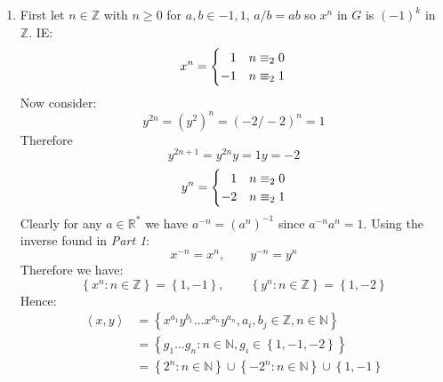 \documentclass[a4paper, 11pt]{article}
\newcommand{\NN}{\mathbb{N}}
\newcommand{\ZZ}{\mathbb{Z}}
\newcommand{\RR}{\mathbb{R}}
\def\set#1{\left\{ #1 \right\}}
\def\gen#1{\left\langle#1 \right\rangle}
\begin{document}
\begin{enumerate}[label=(\alph*)]
	\item 
	First let $n\in\ZZ$ with $n\geq 0$ for $a,b\in{-1,1}$, $a/b=ab$ so $x^n$ in $G$ is $(-1)^k$ in $\ZZ$. IE: 
	\[
		x^n = \begin{cases}
			\hphantom{-}
			 1 & n \equiv_2 0  \\
			-1 & n \equiv_2 1 
		\end{cases}	
	\]
	Now consider:
	\[
		y^{2n} = (y^2)^n = (-2/-2)^n = 1	
	\]  
	Therefore 
	\[
		y^{2n+1}=y^{2n}y = 1y = -2
	\]
	\[
		y^n = \begin{cases}
			\hphantom{-}
			 1 & n \equiv_2 0  \\
			-2 & n \equiv_2 1 
		\end{cases}	
	\]
	Clearly for any $a\in\RR^*$ we have $a^{-n}=(a^n)^{-1}$ since $a^{-n}a^{n}=1$. Using the inverse found in \textit{Part 1}: 
	\[
		x^{-n}=x^n	
		,\qquad
		y^{-n}=y^n 	
	\]
	Therefore we have:
	\[
		\set{x^n: n\in\ZZ}=\set{1,-1},\qquad
		\set{y^n: n\in\ZZ}=\set{1,-2}
	\]
	Hence: 
	\begin{align*}
		\gen{x,y} &= \set{x^{a_1}y^{b_1} \dots x^{a_n}y^{a_n},a_i,b_j\in\ZZ, n\in\NN} \\
				  &= \set{g_1\dots g_n :n\in\NN, g_i\in \set{1,-1,-2}} \\
		          &= \set{2^n : n\in\NN}
		\cup\set{-2^n:n\in\NN}\cup\set{1,-1}
	\end{align*}


\end{enumerate}

\pagebreak 
\end{document}
